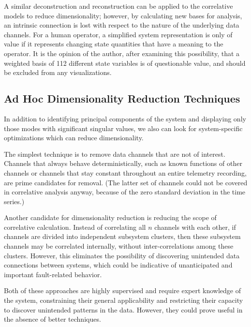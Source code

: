 A similar deconstruction and reconstruction can be applied to the correlative models to reduce dimensionality; however, by calculating new bases for analysis, an intrinsic connection is lost with respect to the nature of the underlying data channels. For a human operator, a simplified system representation is only of value if it represents changing state quantities that have a meaning to the operator. It is the opinion of the author, after examining this possibility, that a weighted basis of 112 different state variables is of questionable value, and should be excluded from any visualizations.

\subsection{Ad Hoc Dimensionality Reduction Techniques}

In addition to identifying principal components of the system and displaying only those modes with significant singular values, we also can look for system-specific optimizations which can reduce dimensionality.

The simplest technique is to remove data channels that are not of interest. Channels that always behave deterministically, such as known functions of other channels or channels that stay constant throughout an entire telemetry recording, are prime candidates for removal. (The latter set of channels could not be covered in correlative analysis anyway, because of the zero standard deviation in the time series.)

Another candidate for dimensionality reduction is reducing the scope of correlative calculation. Instead of correlating all $n$ channels with each other, if channels are divided into independent subsystem clusters, then these subsystem channels may be correlated internally, without inter-correlations among these clusters. However, this eliminates the possibility of discovering unintended data connections between systems, which could be indicative of unanticipated and important fault-related behavior.

Both of these approaches are highly supervised and require expert knowledge of the system, constraining their general applicability and restricting their capacity to discover unintended patterns in the data. However, they could prove useful in the absence of better techniques.




